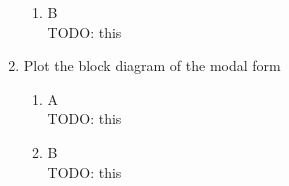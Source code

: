 \begin{enumerate}
\begin{enumerate}
    \item B\\
      {\LARGE \color{red} TODO: this}
    \end{enumerate}
  \item Plot the block diagram of the modal form\\
    \begin{enumerate}
    \item A\\
      {\LARGE \color{red} TODO: this}
    \item B\\
      {\LARGE \color{red} TODO: this}
    \end{enumerate}
  \end{enumerate}